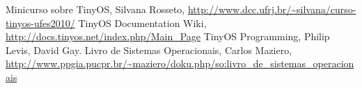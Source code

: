 \documentclass[a4paper,onecolumn, 10pt]{article}
\begin{document}
\pagebreak

\begin{thebibliography}{99}

 Minicurso sobre TinyOS, Silvana Rosseto,
    \url{http://www.dcc.ufrj.br/~silvana/curso-tinyos-ufes2010/} 
 TinyOS Documentation Wiki, \url{http://docs.tinyos.net/index.php/Main_Page}
 TinyOS Programming, Philip Levis, David Gay.
 Livro de Sistemas Operacionais, Carlos Maziero,
    \url{http://www.ppgia.pucpr.br/~maziero/doku.php/so:livro_de_sistemas_operacionais}

\end{thebibliography}
\end{document}
